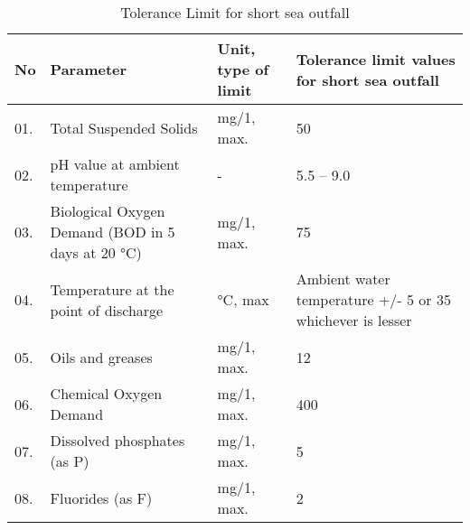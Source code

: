 \begin{table}[H]
\caption{Tolerance Limit for short sea outfall}
\centering
\begin{tabular}{|p{1cm}|p{6cm}|p{4cm}|p{4cm}|} \hline
No & Parameter & Unit, type of limit & Tolerance limit values for short sea outfall \\ \hline
01. & Total Suspended Solids  & mg/1, max. & 50 \\ \hline
02. & pH value at ambient temperature & - & 5.5 – 9.0 \\ \hline
03. & Biological Oxygen Demand (BOD in 5 days at 20 °C) & mg/1, max. & 75 \\ \hline
04. & Temperature at the point of discharge & °C, max & Ambient water temperature +/- 5 or 35 whichever is lesser \\ \hline
05. & Oils and greases & mg/1, max. & 12  \\ \hline
06. & Chemical Oxygen Demand  & mg/1, max. & 400  \\ \hline
07. & Dissolved phosphates (as P) & mg/1, max. & 5  \\ \hline
08. & Fluorides (as F) & mg/1, max. & 2  \\ \hline
\end{tabular}
\label{table:tolerance_limit_details}
\end{table}